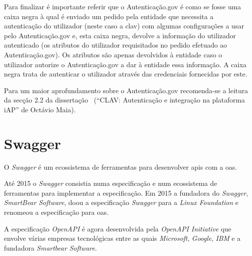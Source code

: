 Para finalizar é importante referir que o Autenticação.gov é como se fosse uma caixa negra à qual é enviado um pedido pela entidade que necessita a autenticação do utilizador (neste caso a \acrshort{clav}) com algumas configurações a usar pelo Autenticação.gov e, esta caixa negra, devolve a informação do utilizador autenticado (os atributos do utilizador requisitados no pedido efetuado ao Autenticação.gov). Os atributos são apenas devolvidos à entidade caso o utilizador autorize o Autenticação.gov a dar à entidade essa informação. A caixa negra trata de autenticar o utilizador através das credenciais fornecidas por este.

Para um maior aprofundamento sobre o Autenticação.gov recomenda-se a leitura da secção 2.2 da dissertação~\cite{otavioTese} (``CLAV: Autenticação e integração na plataforma iAP'' de Octávio Maia).

\section{Swagger}
O \textit{Swagger} é um ecossistema de ferramentas para desenvolver \acrshort{api}s com a \acrfull{oas}.

Até 2015 o \textit{Swagger} consistia numa especificação e num ecossistema de ferramentas para implementar a especificação. Em 2015 a fundadora do \textit{Swagger}, \textit{SmartBear Software}, doou a especificação \textit{Swagger} para a \textit{Linux Foundation} e renomeou a especificação para \acrlong{oas}.~\cite{wiswagger}

A especificação \textit{OpenAPI} é agora desenvolvida pela \textit{OpenAPI Initiative} que envolve várias empresas tecnológicas entre as quais \textit{Microsoft}, \textit{Google}, \textit{IBM} e a fundadora \textit{Smartbear Software}.

